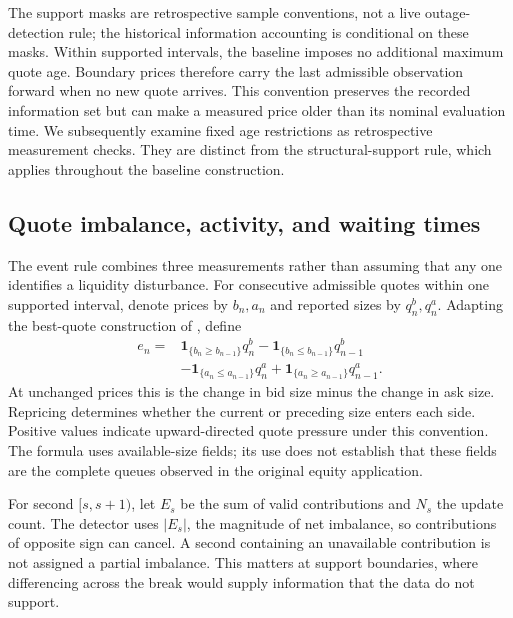 \documentclass[12pt,letterpaper]{article}
\begin{document}
The support masks are retrospective sample conventions, not a live outage-detection rule; the historical information accounting is conditional on these masks. Within supported intervals, the baseline imposes no additional maximum quote age. Boundary prices therefore carry the last admissible observation forward when no new quote arrives. This convention preserves the recorded information set but can make a measured price older than its nominal evaluation time. We subsequently examine fixed age restrictions as retrospective measurement checks. They are distinct from the structural-support rule, which applies throughout the baseline construction.

\subsection{Quote imbalance, activity, and waiting times}
The event rule combines three measurements rather than assuming that any one identifies a liquidity disturbance. For consecutive admissible quotes within one supported interval, denote prices by $b_n,a_n$ and reported sizes by $q_n^b,q_n^a$. Adapting the best-quote construction of \citet{cont2014price}, define
\begin{equation}\begin{aligned}
e_n={}&\mathbf{1}_{\{b_n\ge b_{n-1}\}}q_n^b-
\mathbf{1}_{\{b_n\le b_{n-1}\}}q_{n-1}^b\\
&-\mathbf{1}_{\{a_n\le a_{n-1}\}}q_n^a+
\mathbf{1}_{\{a_n\ge a_{n-1}\}}q_{n-1}^a .
\end{aligned}\label{eq:imbalance}\end{equation}
At unchanged prices this is the change in bid size minus the change in ask size. Repricing determines whether the current or preceding size enters each side. Positive values indicate upward-directed quote pressure under this convention. The formula uses available-size fields; its use does not establish that these fields are the complete queues observed in the original equity application.

For second $[s,s+1)$, let $E_s$ be the sum of valid contributions and $N_s$ the update count. The detector uses $|E_s|$, the magnitude of net imbalance, so contributions of opposite sign can cancel. A second containing an unavailable contribution is not assigned a partial imbalance. This matters at support boundaries, where differencing across the break would supply information that the data do not support.
\end{document}
